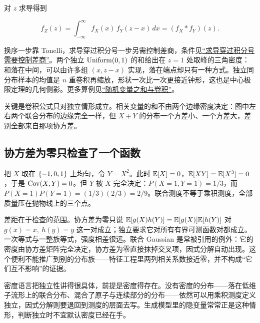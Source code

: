 对 \(z\) 求导得到

\[
f_Z(z)=\int_{-\infty}^{\infty}f_X(x)\,f_Y(z-x)\,dx=(f_X*f_Y)(z).
\]

换序一步靠 Tonelli，求导穿过积分号一步另需控制差商，条件见\hyperref[sec:12-Real-Analysis-Support/04-Limits-and-Integration/03]{``求导穿过积分号需要控制差商''}。两个独立 \(\operatorname{Uniform}(0,1)\) 的和给出在 \(z=1\) 处取峰的三角密度：和落在中间，可以由许多组 \((x,z-x)\) 实现，落在端点却只有一种方式。独立同分布样本的均值是 \(n\) 重卷积再缩放，形状一次比一次更接近钟形，这也是中心极限定理的几何侧影。更多算例见\hyperref[sec:05-Probability/05-Joint-Distributions/03]{``随机变量之和与卷积''}。

关键是卷积公式只对独立情形成立。相关变量的和不由两个边缘密度决定：图中左右两个联合分布的边缘完全一样，但 \(X+Y\) 的分布一个方差小、一个方差大，差别全部来自那项协方差。

\subsection{协方差为零只检查了一个函数}

把 \(X\) 取在 \(\left\{-1,0,1\right\}\) 上均匀，令 \(Y=X^2\)。此时 \(\mathbb{E}[X]=0\)，\(\mathbb{E}[XY]=\mathbb{E}[X^3]=0\)，于是 \(\operatorname{Cov}(X,Y)=0\)。但 \(Y\) 被 \(X\) 完全决定：\(P(X=1,Y=1)=1/3\)，而 \(P(X=1)P(Y=1)=(1/3)(2/3)=2/9\)。联合测度不等于乘积测度，全部质量压在抛物线上的三个点。

差距在于检查的范围。协方差为零只说 \(\mathbb{E}[g(X)h(Y)]=\mathbb{E}[g(X)]\mathbb{E}[h(Y)]\) 对 \(g(x)=x,\ h(y)=y\) 这一对成立；独立要求它对所有有界可测函数对都成立。一次等式与一整族等式，强度相差很远。联合 Gaussian 是常被引用的例外：它的密度由协方差矩阵完全决定，协方差为零直接抹掉交叉项，因式分解自动出现。这个便利不能推广到别的分布族——特征工程里两列相关系数接近零，并不构成``它们互不影响''的证据。

密度语言把独立性讲得很具体，前提是密度得存在。没有密度的分布——落在低维子流形上的联合分布、混合了原子与连续部分的分布——依然可以用乘积测度定义独立，因式分解则要退回到测度的层面去写。生成模型里的隐变量常常正是这种情形，判断独立时不宜默认密度已经在手。
